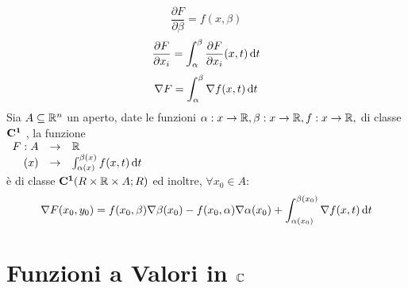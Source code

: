 $$\frac{\partial F}{\partial \beta}=f(x,\beta)$$
$$\frac{\partial F}{\partial x_i}=\int_{\alpha}^{\beta}\frac{\partial F}{\partial x_i}(x,t)\,\mathrm{d}{t}$$
$$\nabla F=\int_{\alpha}^{\beta}\nabla f(x,t)\,\mathrm{d}{t}$$
\corollary
Sia $A\subseteq \mathbb{R}^n$ un aperto, date le funzioni $\alpha:x\rightarrow \mathbb{R}, \beta:x\rightarrow \mathbb{R}, f:x\rightarrow \mathbb{R}, $ di classe $\mathbf{C^{1}}$ , la funzione \\
$\begin{array}{rcl} F: A & \to & \mathbb{R} \\ (x) & \to & \int_{\alpha(x)}^{\beta(x)}f(x,t)\,\mathrm{d}{t} \end{array}$\\
è di classe $\mathbf{C^{1}}(R\times \mathbb{R}\times A;R)$ ed inoltre, $\forall x_0 \in A$:
$$\nabla F(x_0,y_0)=f(x_0,\beta)\nabla\beta(x_0)-f(x_0,\alpha)\nabla\alpha(x_0)+\int_{\alpha(x_0)}^{\beta(x_0)}\nabla f(x,t)\,\mathrm{d}{t}$$

\section{Funzioni a Valori in $\protect\mathbb{C}$}

